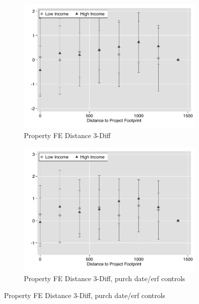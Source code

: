 \documentclass[12pt]{article}
\begin{document}
\begin{figure}
        \centering
        \begin{subfigure}[b]{0.48\textwidth}
                    \caption[Network2]%
            {{\footnotesize Property FE Distance 3-Diff}}    
            \label{fig:prefor}
            \centering
            \includegraphics[width=\textwidth,trim={0.3cm .3cm 0.1cm 0cm}, clip=true]{figures/price_dist_3d_no_ctrl_pfe}
        \end{subfigure}
        \hfill
        \begin{subfigure}[b]{0.48\textwidth}
                    \caption[Network2]%
            {{\footnotesize Property FE Distance 3-Diff, purch date/erf controls}}    
            \label{fig:prefor}
            \centering
            \includegraphics[width=\textwidth,trim={0.3cm .3cm 0.1cm 0cm}, clip=true]{figures/price_dist_3d_ctrl_pfe}

\end{subfigure}
\end{figure}
\end{document}
